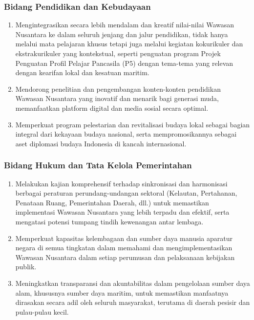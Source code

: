 \documentclass[12pt, a4paper]{article}
\begin{document}
\subsubsection*{Bidang Pendidikan dan Kebudayaan}
\begin{enumerate}
  \item Mengintegrasikan secara lebih mendalam dan kreatif nilai-nilai Wawasan Nusantara ke dalam seluruh jenjang dan jalur pendidikan, tidak hanya melalui mata pelajaran khusus tetapi juga melalui kegiatan kokurikuler dan ekstrakurikuler yang kontekstual, seperti penguatan program Projek Penguatan Profil Pelajar Pancasila (P5) dengan tema-tema yang relevan dengan kearifan lokal dan kesatuan maritim.
  \item Mendorong penelitian dan pengembangan konten-konten pendidikan Wawasan Nusantara yang inovatif dan menarik bagi generasi muda, memanfaatkan platform digital dan media sosial secara optimal.
  \item Memperkuat program pelestarian dan revitalisasi budaya lokal sebagai bagian integral dari kekayaan budaya nasional, serta mempromosikannya sebagai aset diplomasi budaya Indonesia di kancah internasional.
\end{enumerate}
\subsubsection*{Bidang Hukum dan Tata Kelola Pemerintahan}
\begin{enumerate}
  \item Melakukan kajian komprehensif terhadap sinkronisasi dan harmonisasi berbagai peraturan perundang-undangan sektoral (Kelautan, Pertahanan, Penataan Ruang, Pemerintahan Daerah, dll.) untuk memastikan implementasi Wawasan Nusantara yang lebih terpadu dan efektif, serta mengatasi potensi tumpang tindih kewenangan antar lembaga.
  \item Memperkuat kapasitas kelembagaan dan sumber daya manusia aparatur negara di semua tingkatan dalam memahami dan mengimplementasikan Wawasan Nusantara dalam setiap perumusan dan pelaksanaan kebijakan publik.
  \item Meningkatkan transparansi dan akuntabilitas dalam pengelolaan sumber daya alam, khususnya sumber daya maritim, untuk memastikan manfaatnya dirasakan secara adil oleh seluruh masyarakat, terutama di daerah pesisir dan pulau-pulau kecil.
\end{enumerate}
\end{document}
